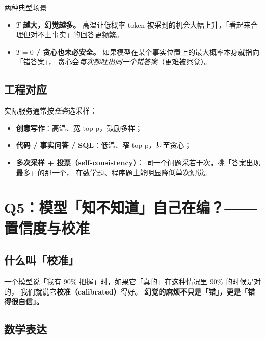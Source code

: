 \documentclass[11pt,a4paper]{ctexart}
\begin{document}
\begin{mathbox}{两种典型场景}
\begin{itemize}
  \item \textbf{$T$ 越大，幻觉越多。}
        高温让低概率 token 被采到的机会大幅上升，「看起来合理但对不上事实」的回答更频繁。
  \item \textbf{$T = 0$ / 贪心也未必安全。}
        如果模型在某个事实位置上的最大概率本身就指向「错答案」，
        贪心会\emph{每次都吐出同一个错答案}（更难被察觉）。
\end{itemize}
\end{mathbox}

\subsection{工程对应}

\begin{engbox}
实际服务通常按\emph{任务}选采样：
\begin{itemize}
  \item \textbf{创意写作}：高温、宽 top-p，鼓励多样；
  \item \textbf{代码 / 事实问答 / SQL}：低温、窄 top-p，甚至贪心；
  \item \textbf{多次采样 + 投票（self-consistency）}：
        同一个问题采若干次，挑「答案出现最多」的那一个，
        在数学题、程序题上能明显降低单次幻觉。
\end{itemize}
\end{engbox}

\section{Q5：模型「知不知道」自己在编？——置信度与校准}

\subsection{什么叫「校准」}

\begin{intuitionblock}
一个模型说「我有 90\% 把握」时，如果它「真的」在这种情况里 90\% 的时候是对的，
我们就说它\textbf{校准（calibrated）}得好。
\textbf{幻觉的麻烦不只是「错」，更是「错得很自信」。}
\end{intuitionblock}

\subsection{数学表达}
\end{document}
